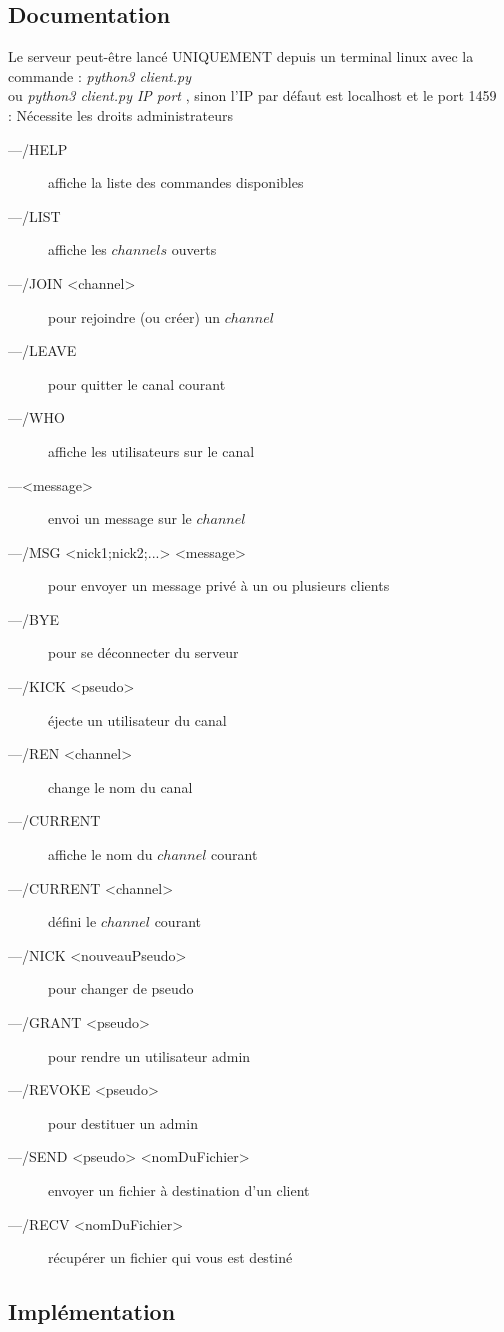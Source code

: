 \documentclass[12pt]{article}
\begin{document}
\subsection{Documentation}
Le serveur peut-être lancé UNIQUEMENT depuis un terminal linux avec
la commande : \emph{python3 client.py}
\\ou \emph{python3 client.py IP port} , sinon l'IP par défaut est localhost et le port 1459
\\ : Nécessite les droits administrateurs
\\
\begin{description}
    \item[---/HELP] affiche la liste des commandes disponibles
\item[---/LIST] affiche les $channels$ ouverts
\item[---/JOIN <channel>] pour rejoindre (ou créer) un $channel$
\item[---/LEAVE] pour quitter le canal courant
\item[---/WHO] affiche les utilisateurs sur le canal
\item[---<message>] envoi un message sur le $channel$
\item[---/MSG <nick1;nick2;...> <message>] pour envoyer un message privé à un ou plusieurs clients
\item[---/BYE] pour se déconnecter du serveur
\item[---/KICK <pseudo>] éjecte un utilisateur du canal
\item[---/REN <channel>] change le nom du canal
\item[---/CURRENT] affiche le nom du $channel$ courant
\item[---/CURRENT <channel>] défini le $channel$ courant
\item[---/NICK <nouveauPseudo>] pour changer de pseudo
\item[---/GRANT <pseudo>] pour rendre un utilisateur admin
\item[---/REVOKE <pseudo>] pour destituer un admin
\item[---/SEND <pseudo> <nomDuFichier>] envoyer un fichier à destination d'un client
\item[---/RECV <nomDuFichier>] récupérer un fichier qui vous est destiné
\end{description}



\subsection{Implémentation}
\end{document}
